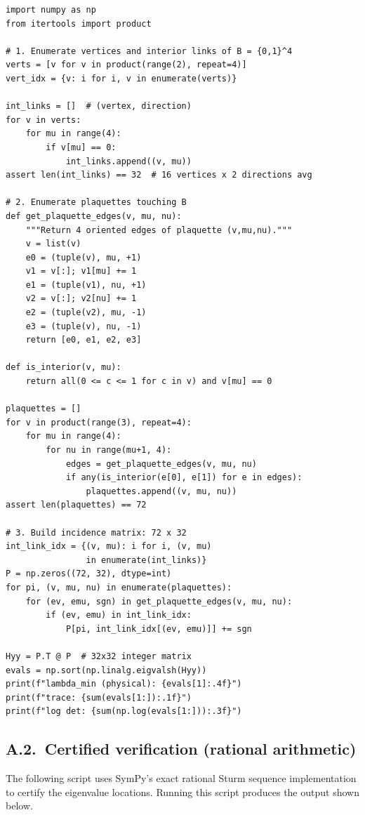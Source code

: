\documentclass[11pt]{article}
\theoremstyle{definition}
\begin{document}
\begin{verbatim}
import numpy as np
from itertools import product

# 1. Enumerate vertices and interior links of B = {0,1}^4
verts = [v for v in product(range(2), repeat=4)]
vert_idx = {v: i for i, v in enumerate(verts)}

int_links = []  # (vertex, direction)
for v in verts:
    for mu in range(4):
        if v[mu] == 0:
            int_links.append((v, mu))
assert len(int_links) == 32  # 16 vertices x 2 directions avg

# 2. Enumerate plaquettes touching B
def get_plaquette_edges(v, mu, nu):
    """Return 4 oriented edges of plaquette (v,mu,nu)."""
    v = list(v)
    e0 = (tuple(v), mu, +1)
    v1 = v[:]; v1[mu] += 1
    e1 = (tuple(v1), nu, +1)
    v2 = v[:]; v2[nu] += 1
    e2 = (tuple(v2), mu, -1)
    e3 = (tuple(v), nu, -1)
    return [e0, e1, e2, e3]

def is_interior(v, mu):
    return all(0 <= c <= 1 for c in v) and v[mu] == 0

plaquettes = []
for v in product(range(3), repeat=4):
    for mu in range(4):
        for nu in range(mu+1, 4):
            edges = get_plaquette_edges(v, mu, nu)
            if any(is_interior(e[0], e[1]) for e in edges):
                plaquettes.append((v, mu, nu))
assert len(plaquettes) == 72

# 3. Build incidence matrix: 72 x 32
int_link_idx = {(v, mu): i for i, (v, mu)
                in enumerate(int_links)}
P = np.zeros((72, 32), dtype=int)
for pi, (v, mu, nu) in enumerate(plaquettes):
    for (ev, emu, sgn) in get_plaquette_edges(v, mu, nu):
        if (ev, emu) in int_link_idx:
            P[pi, int_link_idx[(ev, emu)]] += sgn

Hyy = P.T @ P  # 32x32 integer matrix
evals = np.sort(np.linalg.eigvalsh(Hyy))
print(f"lambda_min (physical): {evals[1]:.4f}")
print(f"trace: {sum(evals[1:]):.1f}")
print(f"log det: {sum(np.log(evals[1:])):.3f}")
\end{verbatim}

\subsection*{A.2.~Certified verification (rational arithmetic)}

The following script uses SymPy's exact rational Sturm sequence
implementation to certify the eigenvalue locations.  Running this
script produces the output shown below.
\end{document}
